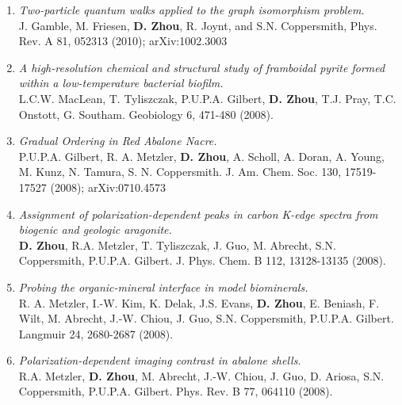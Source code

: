 \documentclass[centered,11pt,overlapped]{res}
\begin{document}
\begin{resume}
{\begin{enumerate}[leftmargin=-0.02in]
{\bf D. Zhou}, A. Lang, and R. Joynt, QIP 9, 727 (2010); arXiv:0912.3313
\item {\em Two-particle quantum walks applied to the graph isomorphism problem.} \\
J. Gamble, M. Friesen, {\bf D. Zhou}, R. Joynt, and S.N. Coppersmith, Phys. Rev. A 81, 052313 (2010); arXiv:1002.3003
\item {\em A high-resolution chemical and structural study of framboidal pyrite formed within a low-temperature bacterial biofilm.}\\
L.C.W. MacLean, T. Tyliszczak, P.U.P.A. Gilbert, {\bf D. Zhou}, T.J. Pray, T.C. Onstott, G. Southam.  Geobiology 6, 471-480 (2008).
\item {\em Gradual Ordering in Red Abalone Nacre.}\\
P.U.P.A. Gilbert, R. A. Metzler, {\bf D. Zhou}, A. Scholl, A. Doran, A. Young, M. Kunz, N. Tamura, S. N. Coppersmith. J. Am. Chem. Soc. 130, 17519-17527 (2008); arXiv:0710.4573
\item {\em Assignment of polarization-dependent peaks in carbon K-edge spectra from biogenic and geologic aragonite.}\\
{\bf D. Zhou}, R.A. Metzler, T. Tyliszczak, J. Guo, M. Abrecht, S.N. Coppersmith, P.U.P.A. Gilbert. J. Phys. Chem. B 112, 13128-13135 (2008).
\item {\em Probing the organic-mineral interface in model biominerals.}\\
R. A. Metzler, I.-W. Kim, K. Delak, J.S. Evans, {\bf D. Zhou}, E. Beniash, F. Wilt, M. Abrecht, J.-W. Chiou, J. Guo, S.N. Coppersmith, P.U.P.A. Gilbert.  Langmuir 24, 2680-2687 (2008).
\item {\em Polarization-dependent imaging contrast in abalone shells.}\\
R.A. Metzler, {\bf D. Zhou}, M. Abrecht, J.-W. Chiou, J. Guo, D. Ariosa, S.N. Coppersmith, P.U.P.A. Gilbert. Phys. Rev. B 77, 064110 (2008).
\end{enumerate}

}





\end{resume}
\end{document}
